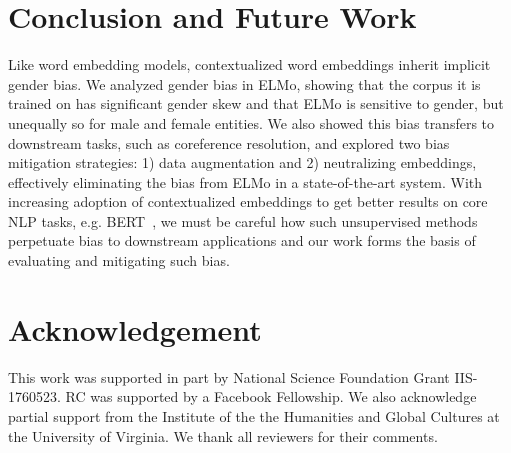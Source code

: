 \documentclass[11pt,a4paper]{article}
\begin{document}
\section{Conclusion and Future Work}
\label{sec:conclusion}
Like word embedding models, contextualized word embeddings inherit implicit gender bias.
We analyzed gender bias in ELMo, showing that the corpus it is trained on has significant gender skew and that ELMo is sensitive to gender, but unequally so for male and female entities.
We also showed this bias transfers to downstream tasks, such as coreference resolution, and explored two bias mitigation strategies: 1) data augmentation and 2) neutralizing embeddings, effectively eliminating the bias from ELMo in a state-of-the-art system.
With increasing adoption of contextualized embeddings to get better results on core NLP tasks, e.g. BERT~\cite{devlin2018bert},
we must be careful how such unsupervised methods perpetuate bias to downstream applications and our work forms the basis of evaluating and mitigating such bias.




\section*{Acknowledgement}
This work was supported in part by National Science Foundation Grant IIS-1760523. RC was supported by a Facebook Fellowship. We also acknowledge partial support from the Institute of the the Humanities and Global Cultures at the University of Virginia. We thank all reviewers for their comments.





\end{document}
